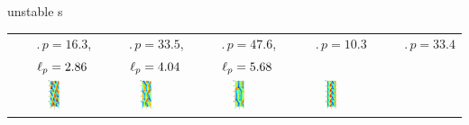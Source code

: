 \documentclass{beamer}
\begin{document}
\begin{frame}{unstable \rpo s}

\scriptsize
 \begin{tabular}{ccccc}
~~~$\period{p} = 16.3$, & ~~~$\period{p} = 33.5$,  & ~~~$\period{p} = 47.6$,  &
~~~$\period{p} = 10.3$ & ~~~$\period{p} = 33.4$\\
~~~$\ell_p = 2.86$ & ~~~$\ell_p = 4.04$ & ~~~$\ell_p = 5.68$ &
&\\
\includegraphics[width=0.15\textwidth,clip=true]{../../figs/ks22rpo016.3-02.86.eps}\hspace{-3ex} &
\includegraphics[width=0.15\textwidth,clip=true]{../../figs/ks22rpo033.5-04.04.eps}\hspace{-3ex} &
\includegraphics[width=0.15\textwidth,clip=true]{../../figs/ks22rpo047.6-05.68.eps}\hspace{-3ex} &
\includegraphics[width=0.15\textwidth,clip=true]{../../figs/ks22rpo020.5-00.00.eps}\hspace{-3ex} &

\end{tabular}
\end{frame}
\end{document}
